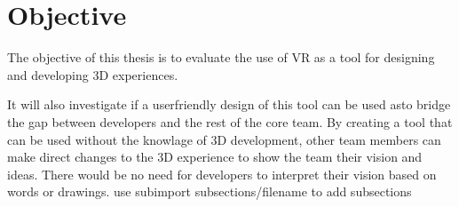 \section{Objective}
The objective of this thesis is to evaluate the use of VR as a tool for designing and developing 3D experiences.

It will also investigate if a userfriendly design of this tool can be used asto bridge the gap between developers and the rest of the core team. By creating a tool that can be used without the knowlage of 3D development, other team members can make direct changes to the 3D experience to show the team their vision and ideas. There would be no need for developers to interpret their vision based on words or drawings. 
use subimport {subsections/}{filename} to add subsections
